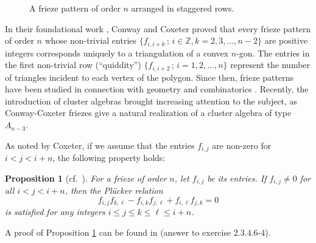 \documentclass[11pt]{amsart}
\theoremstyle{plain}
\newtheorem{proposition}{Proposition}
\theoremstyle{definition}
\theoremstyle{remark}
\begin{document}
\begin{figure}[htbp]
\caption{A frieze pattern of order $n$ arranged in staggered rows.}
\label{fig.1}
\end{figure}

In their foundational work \cite{ConwayCoxeter1973},
Conway and Coxeter proved that every frieze pattern of order $n$
whose non-trivial entries $\{f_{i,i+k}\, ;\, i\in \mathbb{Z}, k=2,3,\ldots,n-2\}$
are positive integers corresponds uniquely to a triangulation of a convex
$n$-gon.
The entries in the first non-trivial row (``quiddity''\cite{ConwayCoxeter1973}) $\{f_{i,i+2}\, ;\, i=1,2,\ldots, n \}$
represent the number of triangles incident to each vertex of the polygon.
Since then, frieze patterns have been studied in connection with geometry
and combinatorics \cite{Genoud2015, Nisiyama2022}.
Recently, the introduction of cluster algebras \cite{FominZelevinsky2002}
brought increasing attention to the subject,
as Conway-Coxeter friezes give a natural realization of a cluster algebra of
type $A_{n-3}$.

As noted by Coxeter\cite{Coxeter1971}, if we assume that the entries $f_{i,j}$ are non-zero for
$i < j < i+n$,
the following property holds:
\begin{proposition}[cf.~\protect\cite{Coxeter1971}] \label{prop.coxeter}
For a frieze of order $n$, let $f_{i,j}$ be its entries.
If $f_{i,j} \neq 0$ for all $i < j < i+n$, then the Plücker relation
\begin{equation} \label{eq.plucker}
    f_{i,j}f_{k,\ell} - f_{i,k}f_{j,\ell} + f_{i,\ell}f_{j,k} = 0
\end{equation}
is satisfied for any integers $i \leq j \leq k \leq \ell \leq i+n$.
\end{proposition}
A proof of Proposition \ref{prop.coxeter} can be found in \cite{Knuth1997}
(answer to exercise 2.3.4.6-4).
\end{document}
